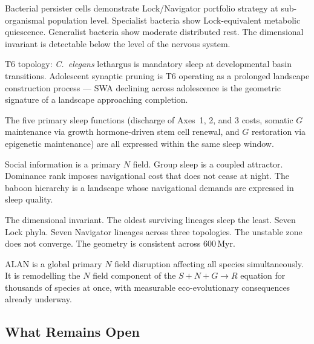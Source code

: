 \documentclass[10pt, a4paper]{article}
\begin{document}
\begin{description}[itemsep=0.3em]
  \item[Single-celled organisms]
    Bacterial persister cells
    demonstrate Lock/Navigator portfolio
    strategy at sub-organismal population
    level. Specialist bacteria show
    Lock-equivalent metabolic quiescence.
    Generalist bacteria show moderate
    distributed rest. The dimensional
    invariant is detectable below the
    level of the nervous system.

  \item[Developmental organisms]
    T6 topology: \textit{C.~elegans}
    lethargus is mandatory sleep at
    developmental basin transitions.
    Adolescent synaptic pruning is
    T6 operating as a prolonged landscape
    construction process --- SWA
    declining across adolescence is
    the geometric signature of a
    landscape approaching completion.

  \item[Individual organisms]
    The five primary sleep functions
    (discharge of Axes~1, 2, and 3 costs,
    somatic $G$ maintenance via growth
    hormone-driven stem cell renewal,
    and $G$ restoration via epigenetic
    maintenance) are all expressed
    within the same sleep window.

  \item[Social groups]
    Social information is a primary
    $N$ field. Group sleep is a coupled
    attractor. Dominance rank imposes
    navigational cost that does not
    cease at night. The baboon hierarchy
    is a landscape whose navigational
    demands are expressed in sleep
    quality.

  \item[Species across deep time]
    The dimensional invariant.
    The oldest surviving lineages
    sleep the least. Seven Lock phyla.
    Seven Navigator lineages across
    three topologies. The unstable zone
    does not converge. The geometry
    is consistent across 600\,Myr.

  \item[The biosphere]
    ALAN is a global primary $N$ field
    disruption affecting all species
    simultaneously. It is remodelling
    the $N$ field component of the
    $S + N + G \rightarrow R$ equation
    for thousands of species at once,
    with measurable eco-evolutionary
    consequences already underway.
\end{description}

\subsection{What Remains Open}
\end{document}
